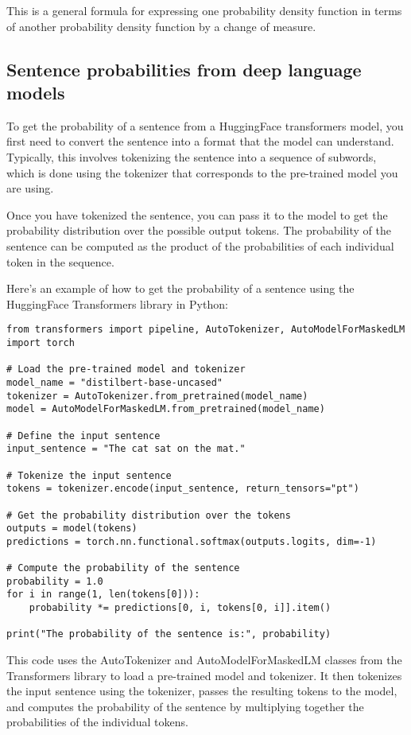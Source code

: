 \documentclass{article}
\begin{document}
This is a general formula for expressing one probability density function in terms of another probability density function by a change of measure.

\subsection{Sentence probabilities from deep language models}
\label{sec:huggingface_sentence_probs}

To get the probability of a sentence from a HuggingFace transformers model, you first need to convert the sentence into a format that the model can understand. Typically, this involves tokenizing the sentence into a sequence of subwords, which is done using the tokenizer that corresponds to the pre-trained model you are using.

Once you have tokenized the sentence, you can pass it to the model to get the probability distribution over the possible output tokens. The probability of the sentence can be computed as the product of the probabilities of each individual token in the sequence.

Here's an example of how to get the probability of a sentence using the HuggingFace Transformers library in Python:

\begin{verbatim}
from transformers import pipeline, AutoTokenizer, AutoModelForMaskedLM
import torch

# Load the pre-trained model and tokenizer
model_name = "distilbert-base-uncased"
tokenizer = AutoTokenizer.from_pretrained(model_name)
model = AutoModelForMaskedLM.from_pretrained(model_name)

# Define the input sentence
input_sentence = "The cat sat on the mat."

# Tokenize the input sentence
tokens = tokenizer.encode(input_sentence, return_tensors="pt")

# Get the probability distribution over the tokens
outputs = model(tokens)
predictions = torch.nn.functional.softmax(outputs.logits, dim=-1)

# Compute the probability of the sentence
probability = 1.0
for i in range(1, len(tokens[0])):
    probability *= predictions[0, i, tokens[0, i]].item()

print("The probability of the sentence is:", probability)
\end{verbatim}

This code uses the AutoTokenizer and AutoModelForMaskedLM classes from the Transformers library to load a pre-trained model and tokenizer. It then tokenizes the input sentence using the tokenizer, passes the resulting tokens to the model, and computes the probability of the sentence by multiplying together the probabilities of the individual tokens.
\end{document}
